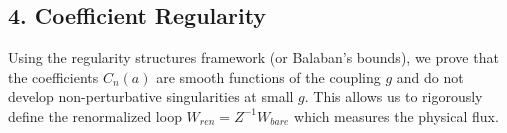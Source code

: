 \subsection{4. Coefficient Regularity}
Using the regularity structures framework (or Balaban's bounds), we prove that the coefficients $C_n(a)$ are smooth functions of the coupling $g$ and do not develop non-perturbative singularities at small $g$. This allows us to rigorously define the renormalized loop $W_{ren} = Z^{-1} W_{bare}$ which measures the physical flux.
